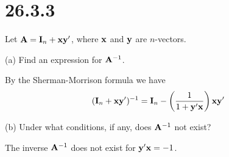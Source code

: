 \section*{26.3.3}
Let ${\bf A}={\bf I}_n+{\bf x}{\bf y}'$, where $\bf x$ and $\bf y$ are $n$-vectors.

\bigskip
\noindent
(a) Find an expression for ${\bf A}^{-1}$.

\bigskip
\noindent
By the Sherman-Morrison formula we have
$$({\bf I}_n+{\bf x}{\bf y}')^{-1}={\bf I}_n-\left({1\over1+{\bf y}'{\bf x}}\right){\bf x}{\bf y}'$$

\bigskip
\noindent
(b) Under what conditions, if any, does ${\bf A}^{-1}$ not exist?

\bigskip
\noindent
The inverse ${\bf A}^{-1}$ does not exist for ${\bf y}'{\bf x}=-1$.
